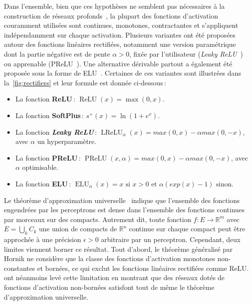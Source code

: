 Dans l'ensemble, bien que ces hypothèses ne semblent pas nécessaires à la construction de réseaux profonds~\cite{oyallon_building_2017}, la plupart des fonctions d'activation couramment utilisées sont continues, monotones, contractantes et s'appliquent indépendamment sur chaque activation. Plusieurs variantes ont été proposées autour des fonctions linéaires rectifiées, notamment une version paramétrique dont la partie négative est de pente $\alpha > 0$, fixée par l'utilisateur (\emph{Leaky ReLU}~\cite{maas_rectifier_2013}) ou apprenable (\gls{PReLU}~\cite{he_delving_2015}). Une alternative dérivable partout a également été proposée sous la forme de \gls{ELU}~\cite{clevert_fast_2015}.
Certaines de ces variantes sont illustrées dans la~\cref{fig:rectifiers} et leur formule est donnée ci-dessous\,:
\begin{itemize}
  \item La fonction \textbf{ReLU}\,: $\operatorname{ReLU}(x) = \max(0,x)$.
  \item La fonction \textbf{SoftPlus}\,: $s^+(x) = \ln(1 + e^x)$.
  \item La fonction \textbf{\emph{Leaky ReLU}}\,: $\operatorname{LReLU}_\alpha(x) = max(0,x) - \alpha max(0,-x)$, avec $\alpha$ un hyperparamètre.
  \item La fonction \textbf{\gls{PReLU}}\,: $\operatorname{PReLU}(x, \alpha) = max(0,x) - \alpha max(0,-x)$, avec $\alpha$ optimisable.
  \item La fonction \textbf{\gls{ELU}}\,: $\operatorname{ELU}_\alpha(x) = x \text{ si } x > 0 \text{ et } \alpha (exp(x) - 1) \text{ sinon}$.
\end{itemize}

Le théorème d'approximation universelle~\cite{cybenko_approximation_1989,hornik_approximation_1991} indique que l'ensemble des fonctions engendrées par les perceptrons est dense dans l'ensemble des fonctions continues par morceaux sur des compacts. Autrement dit, toute fonction $f : E \rightarrow \mathbb{R}^m$ avec $E = \bigcup_k C_k$ une union de compacts de $\mathbb{R}^n$ continue sur chaque compact peut être approchée à une précision $\epsilon > 0$ arbitraire par un perceptron. Cependant, deux limites viennent borner ce résultat. Tout d'abord, le théorème généralisé par Hornik ne considère que la classe des fonctions d'activation monotones non-constantes et bornées, ce qui exclut les fonctions linéaires rectifiées comme \gls{ReLU}. \citet{sonoda_neural_2017} ont néanmoins levé cette limitation en montrant que des réseaux dotés de fonctions d'activation non-bornées satisfont tout de même le théorème d'approximation universelle.

